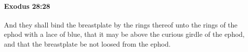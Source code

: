
		\paragraph{Exodus 28:28} %
			\label{EXODUS-28-28}

			And they shall bind the breastplate by the rings thereof unto the rings of the ephod with a lace of blue, that it may be above the curious girdle of the ephod, and that the breastplate be not loosed from the ephod.


